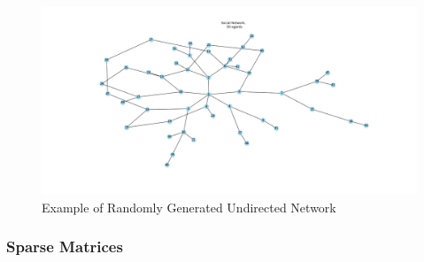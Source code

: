 \documentclass[a4paper, 12pt]{report}
\begin{document}
\begin{center}
    \begin{figure}[!htbp]
        \centering
        \includegraphics[width=1.1\textwidth]{ThesisKI/Images/NoneGraphRandom.png}
        \caption{Example of Randomly Generated Undirected Network}
        \label{network:random}
    \end{figure}
\end{center}
\newpage

\subsubsection{Sparse Matrices}
\end{document}
